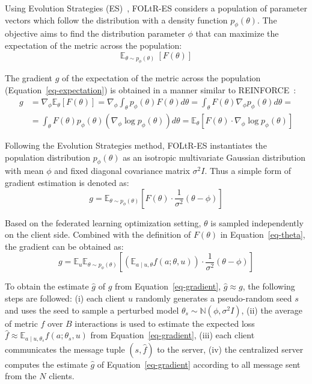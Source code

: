 Using Evolution Strategies (ES)~\cite{salimans2017evolution}, FOLtR-ES considers a population of parameter vectors which follow the distribution with a density function $p_{\phi}(\theta)$. The objective aims to find the distribution parameter $\phi$ that can maximize the expectation of the metric across the population:
\begin{equation}
	 \mathbb{E}_{\theta\sim p_{\phi}(\theta)}~[F(\theta)] \label{eq-expectation}
\end{equation}

The gradient $g$ of the expectation of the metric across the population (Equation~\ref{eq-expectation}) is obtained in a manner similar to REINFORCE~\cite{williams1992simple}:
\begin{equation}
	\begin{aligned}
		g &=\nabla_{\phi} \mathbb{E}_{\theta}[F(\theta)]=\nabla_{\phi} \int_{\theta} p_{\phi}(\theta) F(\theta) d \theta=\int_{\theta} F(\theta) \nabla_{\phi} p_{\phi}(\theta) d \theta=\\
		&=\int_{\theta} F(\theta) p_{\phi}(\theta)\left(\nabla_{\phi} \log p_{\phi}(\theta)\right) d \theta=\mathbb{E}_{\theta}\left[F(\theta) \cdot \nabla_{\phi} \log p_{\phi}(\theta)\right]
	\end{aligned}
\end{equation}

Following the Evolution Strategies method, FOLtR-ES instantiates the population distribution $p_{\phi}(\theta)$ as an isotropic multivariate Gaussian distribution with mean $\phi$ and fixed diagonal covariance matrix $\sigma^2I$. Thus a simple form of gradient estimation is denoted as:
\begin{equation}
	g=\mathbb{E}_{\theta \sim p_{\phi}(\theta)}\left[F(\theta) \cdot \frac{1}{\sigma^{2}}(\theta-\phi)\right]
\end{equation}

Based on the federated learning optimization setting, $\theta$ is sampled independently on the client side. Combined with the definition of $F(\theta)$ in Equation~\ref{eq-theta}, the gradient can be obtained as:
\begin{equation}
	g=\mathbb{E}_{u} \mathbb{E}_{\theta \sim p_{\phi}(\theta)}\left[\left(\mathbb{E}_{a \mid u, \theta} f(a ; \theta, u)\right) \cdot \frac{1}{\sigma^{2}}(\theta-\phi)\right] \label{eq-gradient}
\end{equation}

To obtain the estimate $\hat{g}$ of $g$ from Equation~\ref{eq-gradient}, $\hat{g} \approx g$, the following steps are followed: (i) each client $u$ randomly generates a pseudo-random seed $s$ and uses the seed to sample a perturbed model $\theta_{s} \sim \mathbb{N}\left(\phi, \sigma^{2} I\right)$, (ii) the average of metric $f$ over $B$ interactions is used to estimate the expected loss $\hat{f} \approx \mathbb{E}_{a \mid u, \theta_{s}} f(a;\theta_s, u) $ from Equation~\ref{eq-gradient}, (iii) each client communicates the message tuple $(s,\hat{f})$ to the server, (iv) the centralized server computes the estimate $\hat{g}$ of Equation~\ref{eq-gradient} according to all message sent from the $N$ clients.


